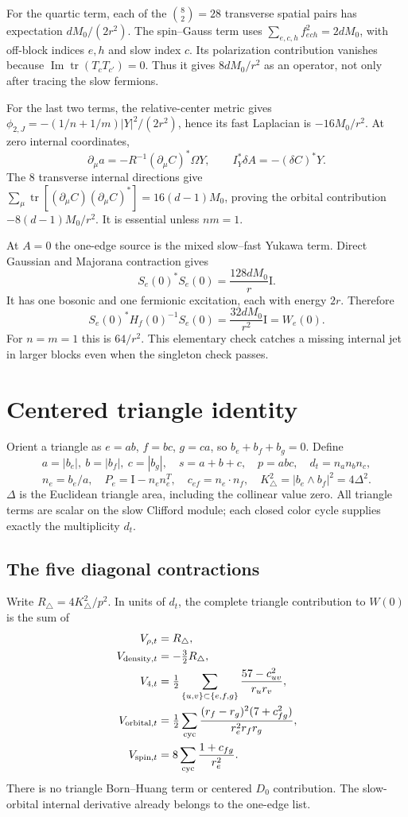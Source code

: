 \documentclass[11pt,letterpaper]{article}
\newcommand{\tr}{\operatorname{tr}}
\newcommand{\Id}{\mathrm I}
\begin{document}
For the quartic term, each of the $\binom82=28$ transverse spatial pairs has expectation $dM_0/(2r^2)$. The spin--Gauss term uses
$\sum_{e,c,h}f_{ech}^2=2dM_0$, with off-block indices $e,h$ and slow index $c$. Its polarization contribution vanishes because $\operatorname{Im}\tr(T_cT_{c'})=0$. Thus it gives $8dM_0/r^2$ as an operator, not only after tracing the slow fermions.

For the last two terms, the relative-center metric gives
$\phi_{2,J}=-(1/n+1/m)|Y|^2/(2r^2)$, hence its fast Laplacian is $-16M_0/r^2$. At zero internal coordinates,
\[
 \partial_\mu a=-R^{-1}(\partial_\mu C)^*\Omega Y,
 \qquad I_Y^*\delta A=-(\delta C)^*Y.
\]
The $8$ transverse internal directions give
$\sum_\mu\tr[(\partial_\mu C)(\partial_\mu C)^*]=16(d-1)M_0$, proving the orbital contribution $-8(d-1)M_0/r^2$. It is essential unless $nm=1$.

At $A=0$ the one-edge source is the mixed slow--fast Yukawa term. Direct Gaussian and Majorana contraction gives
\[
 S_e(0)^*S_e(0)=\frac{128dM_0}{r}\Id.
\]
It has one bosonic and one fermionic excitation, each with energy $2r$. Therefore
\[
 S_e(0)^*H_f(0)^{-1}S_e(0)=\frac{32dM_0}{r^2}\Id=W_e(0).
\]
For $n=m=1$ this is $64/r^2$. This elementary check catches a missing internal jet in larger blocks even when the singleton check passes.

\section{Centered triangle identity}
Orient a triangle as $e=ab$, $f=bc$, $g=ca$, so $b_e+b_f+b_g=0$. Define
\[
 a=|b_e|,\ b=|b_f|,\ c=|b_g|,\quad s=a+b+c,\quad p=abc,
 \quad d_t=n_an_bn_c,
\]
\[
 n_e=b_e/a,\quad P_e=\Id-n_en_e^T,\quad c_{ef}=n_e\cdot n_f,
 \quad K_\triangle^2=|b_e\wedge b_f|^2=4\Delta^2.
\]
$\Delta$ is the Euclidean triangle area, including the collinear value zero. All triangle terms are scalar on the slow Clifford module; each closed color cycle supplies exactly the multiplicity $d_t$.

\subsection{The five diagonal contractions}
Write $R_\triangle=4K_\triangle^2/p^2$. In units of $d_t$, the complete triangle contribution to $W(0)$ is the sum of
\begin{align}
 V_{\rho,t}&=R_\triangle,\\
 V_{{\rm density},t}&=-\tfrac32R_\triangle,\\
 V_{4,t}&=\tfrac12\sum_{\{u,v\}\subset\{e,f,g\}}
              \frac{57-c_{uv}^2}{r_ur_v},\\
 V_{{\rm orbital},t}&=\tfrac12\sum_{\rm cyc}
       \frac{(r_f-r_g)^2(7+c_{fg}^2)}{r_e^2r_fr_g},\\
 V_{{\rm spin},t}&=8\sum_{\rm cyc}\frac{1+c_{fg}}{r_e^2}. \label{eq:trianglepieces}
\end{align}
There is no triangle Born--Huang term or centered $D_0$ contribution. The slow-orbital internal derivative already belongs to the one-edge list.
\end{document}
